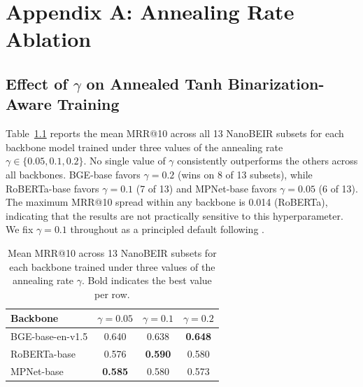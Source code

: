 
\chapter{Appendix A: Annealing Rate Ablation}%

\renewcommand{\thechapter}{A} %

\section{Effect of $\gamma$ on Annealed Tanh Binarization-Aware Training}
\label{sec:gamma_ablation}

Table~\ref{tab:gamma_ablation} reports the mean MRR@10 across all 13
NanoBEIR subsets for each backbone model trained under three values of the
annealing rate $\gamma \in \{0.05, 0.1, 0.2\}$. No single value of $\gamma$
consistently outperforms the others across all backbones. BGE-base favors
$\gamma = 0.2$ (wins on 8 of 13 subsets), while RoBERTa-base favors
$\gamma = 0.1$ (7 of 13) and MPNet-base favors $\gamma = 0.05$ (6 of 13).
The maximum MRR@10 spread within any backbone is 0.014 (RoBERTa),
indicating that the results are not practically sensitive to this
hyperparameter. We fix
$\gamma = 0.1$ throughout as a principled default following
\cite{yamada2021efficient}.

\begin{table}[ht]
    \centering
    \caption[$\gamma$ ablation: mean MRR@10 on NanoBEIR]{Mean MRR@10 across
    13 NanoBEIR subsets for each backbone trained under three values of the
    annealing rate $\gamma$. Bold indicates the best value per row.}
    \label{tab:gamma_ablation}
    \begin{tabular}{lccc}
        \toprule
        \textbf{Backbone} & $\gamma = 0.05$ & $\gamma = 0.1$ & $\gamma = 0.2$ \\
        \midrule
        BGE-base-en-v1.5  & 0.640          & 0.638          & \textbf{0.648} \\
        RoBERTa-base       & 0.576          & \textbf{0.590} & 0.580          \\
        MPNet-base         & \textbf{0.585} & 0.580          & 0.573          \\
        \bottomrule
    \end{tabular}
\end{table}


